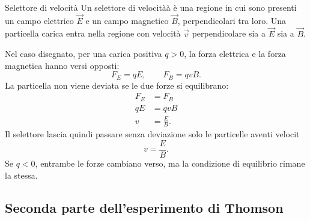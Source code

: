 \documentclass[a4paper]{article}
\begin{document}
\begin{snippetexample}{Selettore di velocità}
    Un selettore di velocitàà è una regione in cui sono presenti un campo elettrico \(\vec{E}\) e un campo magnetico \(\vec{B}\), perpendicolari tra loro. Una particella carica entra nella regione con velocità \(\vec{v}\) perpendicolare sia a \(\vec{E}\) sia a \(\vec{B}\).

    Nel caso disegnato, per una carica positiva \(q>0\), la forza elettrica e la forza magnetica hanno versi opposti:
    \[
        F_E=qE,
        \qquad
        F_B=qvB.
    \]
    La particella non viene deviata se le due forze si equilibrano:
    \begin{align*}
        F_E&=F_B \\
        qE&=qvB \\
        v&=\frac{E}{B}.
    \end{align*}
    Il selettore lascia quindi passare senza deviazione solo le particelle aventi velocit
    \[
        v=\frac{E}{B}.
    \]
    Se \(q<0\), entrambe le forze cambiano verso, ma la condizione di equilibrio rimane la stessa.
\end{snippetexample}

\begin{center}
\end{center}

\subsection{Seconda parte dell'esperimento di Thomson}
\end{document}
